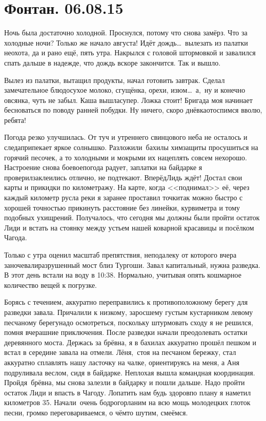 \chapter{Фонтан. 06.08.15}

Ночь была достаточно холодной. Проснулся, потому что снова замёрз. Что за холодные ночи? Только же начало августа! Идёт дождь\ldots~вылезать из палатки неохота, да и рано ещё, пять утра. Накрылся с головой штормовкой и завалился спать дальше в надежде, что дождь вскоре закончится. Так и вышло. 

Вылез из палатки, вытащил продукты, начал готовить завтрак. Сделал замечательное блюдо\mdash сухое молоко, сгущёнка, орехи, изюм\ldots~а,~ну и конечно овсянка, чуть не забыл. Каша вышла\mdash супер. Ложка стоит! Бригада моя начинает бесноваться по поводу ранней побудки. Ну ничего, скоро днёвка\mdash отоспимся вволю, ребята! 

Погода резко улучшилась. От туч и утреннего свинцового неба не осталось и следа\mdash припекает яркое солнышко. Разложили~бахилы химзащиты просушиться на горячий песочек, а то холодными и мокрыми их нацеплять совсем нехорошо. Настроение снова боевое\mdash погода радует, заплатки на байдарке я проверил\mdash заклеились отлично, не подтекают. Вперёд\mdash Лидь ждёт! Достал свои карты и прикидки по километражу. На карте, когда <<поднимал>> её, через каждый километр русла реки я заранее проставил точки\mdash так можно быстро с хорошей точностью прикинуть расстояние без линейки, курвиметра и тому подобных ухищрений. Получалось, что сегодня мы должны были пройти остаток Лиди и встать на стоянку между устьем нашей коварной красавицы и посёлком Чагода.

Только с утра оценил масштаб препятствия, неподалеку от которого вчера заночевали\mdash разрушенный мост близ Тургоши. Завал капитальный, нужна разведка. В этот день встали на воду в 10:38. Нормально, учитывая опять кошмарное количество вещей к погрузке. 

Борясь с течением, аккуратно переправились к противоположному берегу для разведки завала. Причалили к низкому, заросшему густым кустарником левому песчаному берегу\mdash надо осмотреться, поскольку штурмовать сходу я не решился, помня вчерашние приключения. После разведки начали преодолевать остатки деревянного моста. Держась за брёвна, я в бахилах аккуратно прошёл пешком и встал в середине завала на отмели. Лёня,~стоя на песчаном бережку, стал аккуратно сплавлять нашу ласточку на чалке, ориентируясь на меня, а Аня подруливала веслом, сидя в байдарке. Неплохая вышла командная координация. Пройдя~брёвна, мы снова залезли в байдарку и пошли дальше. Надо пройти остаток Лиди и впасть в Чагоду. Лопатить нам будь здоров\mdash по плану я наметил километров 35. Начали~очень бодро\mdash горланим на всю мощь молодецких глоток песни, громко переговариваемся, о чём\sdash то шутим, смеёмся.  

